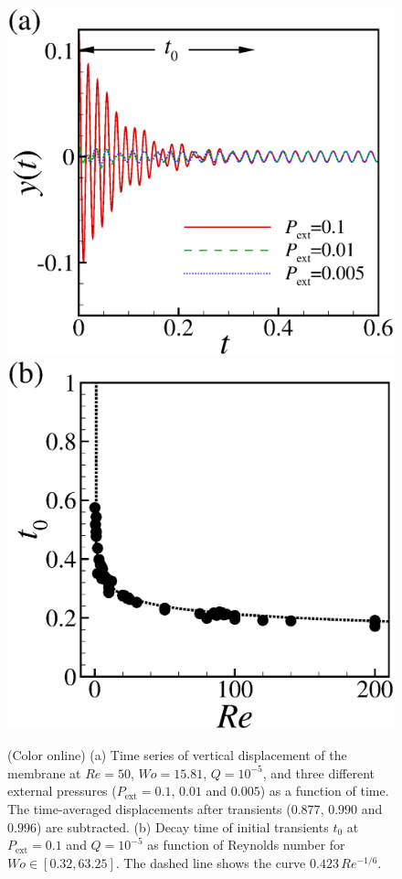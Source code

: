 \documentclass[aps,prl,reprint,superscriptaddress,floatfix]{revtex4-1}
\newcommand{\Rey}{\mathit{Re}}
\newcommand{\Wo}{\mathit{Wo}}
\begin{document}
\begin{figure}
\centering
\includegraphics[width=0.49\linewidth, trim={0.5cm 0.5cm 1.5cm 0.5cm}, clip]{./epsFig/fig2a.eps}
\includegraphics[width=0.49\linewidth, trim={0.5cm 0.5cm 1.5cm 0.5cm}, clip]{./epsFig/fig2b.eps}
\caption{\label{fig:extpressure}(Color online) (a) Time series of vertical displacement of the membrane at $\Rey=50$, $\Wo=15.81$, $Q=10^{-5}$, and three different external pressures ($P_\text{ext}=0.1$, $0.01$ and $0.005$) as a function of time. The time-averaged displacements after transients ($0.877$, $0.990$ and $0.996$) are subtracted. (b) Decay time of initial transients $t_0$ at $P_\text{ext}=0.1$ and $Q= 10^{-5}$ as function of Reynolds number for $\Wo\in[0.32, 63.25]$. The dashed line shows the curve $0.423\,Re^{-1/6}$.}
\end{figure}
\end{document}
